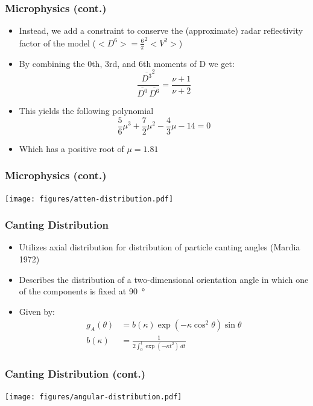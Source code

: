 \documentclass[red]{beamer}
\begin{document}
\begin{frame}[<+->]
	\frametitle{Microphysics (cont.)}
	\begin{itemize}
		\item Instead, we add a constraint to conserve the (approximate) radar reflectivity factor of the model ($<D^6> = \frac{6}{\pi}^2<V^2>$)
		\item By combining the 0th, 3rd, and 6th moments of D we get:
		\begin{equation}
			\frac{\overline{D^3}^2}{\overline{D^0}\,\overline{D^6}} =  \frac{\nu + 1}{\nu + 2}
		\end{equation}
		\item This yields the following polynomial
		\begin{equation}
			\frac{\num{5}}{\num{6}} \mu^3 + \frac{\num{7}}{\num{2}} \mu^2 - \frac{\num{4}}{\num{3}} \mu - \num{14} = 0
		\end{equation}
		\item Which has a positive root of $\mu=\num{1.81}$
	\end{itemize}
\end{frame}

\begin{frame}
	\frametitle{Microphysics (cont.)}
	\begin{center}
		\texttt{[image: figures/atten-distribution.pdf]}
	\end{center}
\end{frame}

\begin{frame}
	\frametitle{Canting Distribution}
	\begin{itemize}
		\item Utilizes axial distribution for distribution of particle canting angles (Mardia 1972)
		\item Describes the distribution of a two-dimensional orientation angle in which one of the components is fixed at \SI{90}{\degree}
		\item Given by:
		\begin{align*}
			g_A(\theta) &= b(\kappa) \exp(-\kappa \cos^2{\theta}) \sin{\theta} \\
			b(\kappa) &= \frac{1}{2 \int_0^1 \exp(-\kappa t^2)\,dt}
		\end{align*}
	\end{itemize}
\end{frame}

\begin{frame}
	\frametitle{Canting Distribution (cont.)}
	\begin{center}
		\texttt{[image: figures/angular-distribution.pdf]}
	\end{center}	
\end{frame}
\end{document}
